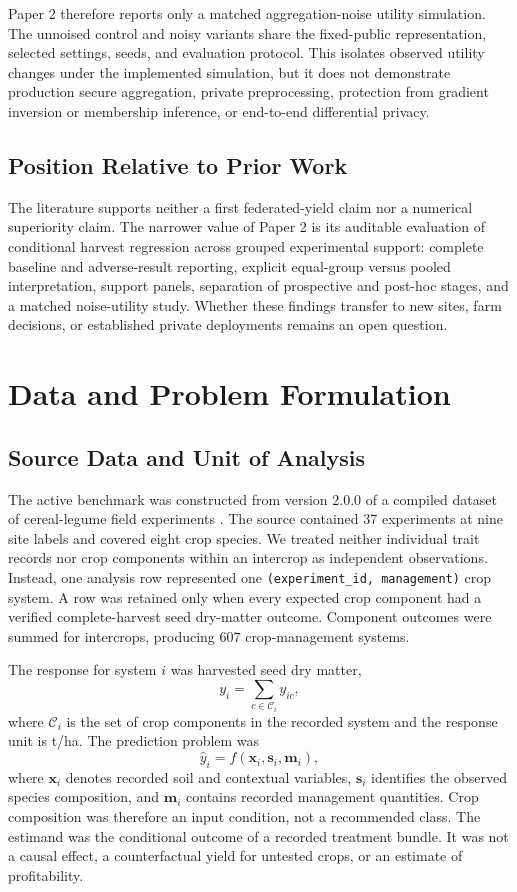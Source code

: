\documentclass[journal]{IEEEtran}
\begin{document}
Paper 2 therefore reports only a matched aggregation-noise utility simulation.
The unnoised control and noisy variants share the fixed-public representation,
selected settings, seeds, and evaluation protocol. This isolates observed
utility changes under the implemented simulation, but it does not demonstrate
production secure aggregation, private preprocessing, protection from gradient
inversion or membership inference, or end-to-end differential privacy.

\subsection{Position Relative to Prior Work}

The literature supports neither a first federated-yield claim nor a numerical
superiority claim. The narrower value of Paper 2 is its auditable evaluation of
conditional harvest regression across grouped experimental support: complete
baseline and adverse-result reporting, explicit equal-group versus pooled
interpretation, support panels, separation of prospective and post-hoc stages,
and a matched noise-utility study. Whether these findings transfer to new sites,
farm decisions, or established private deployments remains an open question.

\section{Data and Problem Formulation}

\subsection{Source Data and Unit of Analysis}

The active benchmark was constructed from version 2.0.0 of a compiled dataset
of cereal-legume field experiments \cite{gaudio2024cereallegume}. The source
contained 37 experiments at nine site labels and covered eight crop species. We
treated neither individual trait records nor crop components within an intercrop
as independent observations. Instead, one analysis row represented one
\texttt{(experiment\_id, management)} crop system. A row was retained only when
every expected crop component had a verified complete-harvest seed dry-matter
outcome. Component outcomes were summed for intercrops, producing 607
crop-management systems.

The response for system $i$ was harvested seed dry matter,
\[
  y_i = \sum_{c \in \mathcal{C}_i} y_{ic},
\]
where $\mathcal{C}_i$ is the set of crop components in the recorded system and
the response unit is t/ha. The prediction problem was
\[
  \hat{y}_i = f(\mathbf{x}_i, \mathbf{s}_i, \mathbf{m}_i),
\]
where $\mathbf{x}_i$ denotes recorded soil and contextual variables,
$\mathbf{s}_i$ identifies the observed species composition, and $\mathbf{m}_i$
contains recorded management quantities. Crop composition was therefore an input
condition, not a recommended class. The estimand was the conditional outcome of
a recorded treatment bundle. It was not a causal effect, a counterfactual yield
for untested crops, or an estimate of profitability.
\end{document}
